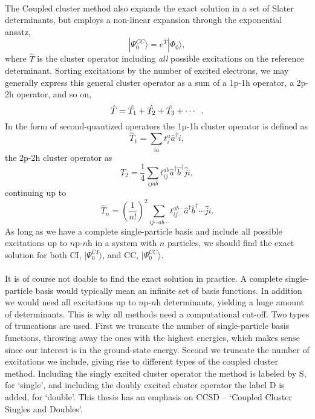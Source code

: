 \paragraph*{}
The Coupled cluster method also expands the exact solution in a set of Slater determinants, but employs a non-linear expansion through the exponential ansatz,
\begin{equation}
\label{eq:CC:expon}
|\Psi_0^{CC} \rangle = e^{\hat{T}} |\Phi_0 \rangle ,
\end{equation}
where $\hat{T}$ is the cluster operator including \textit{all} possible excitations on the reference determinant.
Sorting excitations by the number of excited electrons, we may generally express this general cluster operator as a sum of a 1p-1h operator, a 2p-2h operator, and so on,
\begin{equation}
\hat{T} = \hat{T_1} + \hat{T_2} + \hat{T_3} + \cdots \hspace{2mm}.
\end{equation}
In the form of second-quantized operators the 1p-1h cluster operator is defined as
\begin{equation}
\hat{T}_1 = \sum_{ia} t_i^a \hat{a}^{\dagger} \hat{i},
\end{equation}
the 2p-2h cluster operator as
\begin{equation}
\hat{T}_2 = \frac{1}{4} \sum_{ijab} t_{ij}^{ab} \hat{a}^{\dagger} \hat{b}^{\dagger} \hat{j} \hat{i},
\end{equation}
continuing up to 
\begin{equation}
\hat{T}_n = \left( \frac{1}{n!}\right)^2 \sum_{ij\cdots ab\cdots} t_{ij\cdots}^{ab\cdots} \hat{a}^{\dagger} \hat{b}^{\dagger} \cdots \hat{j} \hat{i} .
\end{equation}
As long as we have a complete single-particle basis and include all possible excitations up to $n$p-$n$h in a system with $n$ particles, we should find the exact solution for both CI, $|\Psi_0^{CI}\rangle$, and CC, $|\Psi_0^{CC}\rangle$.

\paragraph*{}
It is of course not doable to find the exact solution in practice.
A complete single-particle basis would typically mean an infinite set of basis functions.
In addition we would need all excitations up to $n$p-$n$h determinants, yielding a huge amount of determinants. 
This is why all methods need a computational cut-off.
Two types of truncations are used.
First we truncate the number of single-particle basis functions, throwing away the ones with the highest energies, which makes sense since our interest is in the ground-state energy.
Second we truncate the number of excitations we include, giving rise to different types of the coupled cluster method.
Including the singly excited cluster operator the method is labeled by S, for `single', and including the doubly excited cluster operator the label D is added, for `double'.
This thesis has an emphasis on CCSD -- `Coupled Cluster Singles and Doubles'.

